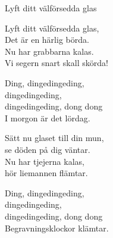 \begin{song}{Lyft ditt välförsedda glas}
	
	
	Lyft ditt välförsedda glas,\\
	Det är en härlig börda.\\
	Nu har grabbarna kalas.\\
	Vi segern snart skall skörda!\\
	\begin{repetition}
		Ding, dingedingeding,\\
		dingedingeding,\\
		dingedingeding, dong dong\\
		I morgon är det lördag.
	\end{repetition}

	Sätt nu glaset till din mun,\\
	se döden på dig väntar.\\
	Nu har tjejerna kalas,\\
	hör liemannen flämtar.\\
	\begin{repetition}
		Ding, dingedingeding,\\
		dingedingeding,\\
		dingedingeding, dong dong\\
		Begravningsklockor klämtar.
	\end{repetition}
	
\end{song}
